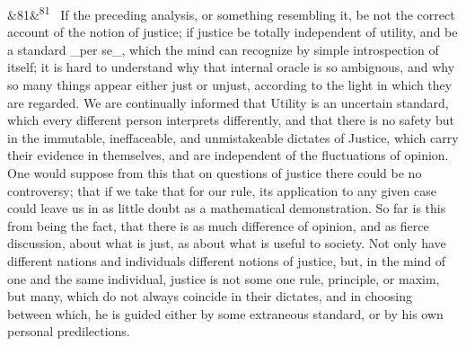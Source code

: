 \documentclass[12pt]{article}
\newcommand{\para}[1][]{\par\noindent\ifx&#1&\else\textsuperscript{\footnotesize #1}~\fi}
\begin{document}
\para[81] If the preceding analysis, or something resembling it, be not the correct account of the notion of justice; if justice be totally independent of utility, and be a standard \_per se\_, which the mind can recognize by simple introspection of itself; it is hard to understand why that internal oracle is so ambiguous, and why so many things appear either just or unjust, according to the light in which they are regarded. We are continually informed that Utility is an uncertain standard, which every different person interprets differently, and that there is no safety but in the immutable, ineffaceable, and unmistakeable dictates of Justice, which carry their evidence in themselves, and are independent of the fluctuations of opinion. One would suppose from this that on questions of justice there could be no controversy; that if we take that for our rule, its application to any given case could leave us in as little doubt as a mathematical demonstration. So far is this from being the fact, that there is as much difference of opinion, and as fierce discussion, about what is just, as about what is useful to society. Not only have different nations and individuals different notions of justice, but, in the mind of one and the same individual, justice is not some one rule, principle, or maxim, but many, which do not always coincide in their dictates, and in choosing between which, he is guided either by some extraneous standard, or by his own personal predilections.
\end{document}
